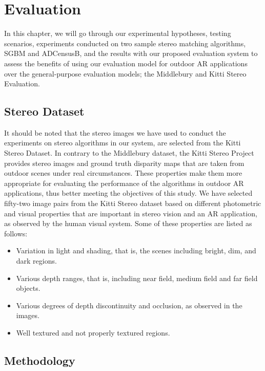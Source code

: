 \chapter{Evaluation}
\label{chap:Evaluation}
\renewcommand{\arraystretch}{0.5}

In this chapter, we will go through our experimental hypotheses, testing scenarios, experiments conducted on two sample 
stereo matching algorithms, SGBM and ADCensusB, and the results with our
proposed evaluation system to assess the benefits of using our evaluation model for outdoor AR applications over the general-purpose evaluation models; 
the Middlebury and Kitti Stereo Evaluation.

\section{Stereo Dataset}
It should be noted that the stereo images we have used to conduct the experiments on stereo algorithms in our system,
are selected from the Kitti Stereo Dataset.
In contrary to the Middlebury dataset, the Kitti Stereo Project provides stereo images and ground truth disparity maps
that are taken from outdoor scenes under real circumstances. These properties make them more appropriate 
for evaluating the performance of the algorithms in outdoor AR applications, thus better meeting the objectives of this study.
We have selected fifty-two image pairs from the Kitti Stereo dataset based on different photometric and visual properties that are important
in stereo vision and an AR application, as observed by the human visual system. Some 
of these properties are listed as follows:
\begin{itemize}
\item Variation in light and shading, that is, the scenes including bright, dim, and dark regions.
\item Various depth ranges, that is, including near field, medium field and far field objects. 
\item Various degrees of depth discontinuity and occlusion, as observed in the images.
\item Well textured and not properly textured regions.
\end{itemize}

\section{Methodology}

